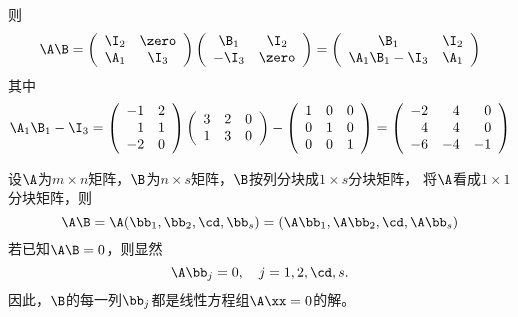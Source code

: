 \begin{frame}\ft{\secname}
则
$$
\A\B = \left(
  \begin{array}{cc}
    \I_2 & \zero\\
    \A_1 & \I_3
  \end{array}
\right)\left(
  \begin{array}{cc}
    \B_1 & \I_2\\
    -\I_3 & \zero
  \end{array}
\right) = \left(
  \begin{array}{cc}
    \B_1 & \I_2\\
    \A_1\B_1-\I_3 & \A_1
  \end{array}
\right)
$$
其中
$$
\A_1\B_1-\I_3 = \left(
  \begin{array}{rr}
    -1&2\\
    1&1\\
    -2&0
  \end{array}
\right)\left(
  \begin{array}{rrr}
    3&2&0\\
    1&3&0
  \end{array}
\right)-\left(
  \begin{array}{ccc}
    1&0&0\\
    0&1&0\\
    0&0&1
  \end{array}
\right)=\left(
  \begin{array}{rrr}
    -2&4&0\\
    4&4&0\\
    -6&-4&-1
  \end{array}
\right)
$$
\end{frame}

\begin{frame}\ft{\secname}

\begin{li}
  设$\A$为$m\times n$矩阵，$\B$为$n\times s$矩阵，$\B$按列分块成$1\times s$分块矩阵，
  将$\A$看成$1\times 1$分块矩阵，则
  $$
  \A\B=\A(\bb_1,\bb_2,\cd,\bb_s)=(\A\bb_1,\A\bb_2,\cd,\A\bb_s)      
  $$
  若已知$\A\B=0$，则显然
  $$
  \A\bb_j=0, \quad j=1,2,\cd,s.
  $$
  因此，$\B$的每一列$\bb_j$都是线性方程组$\A\xx=0$的解。
\end{li}    
\end{frame}

